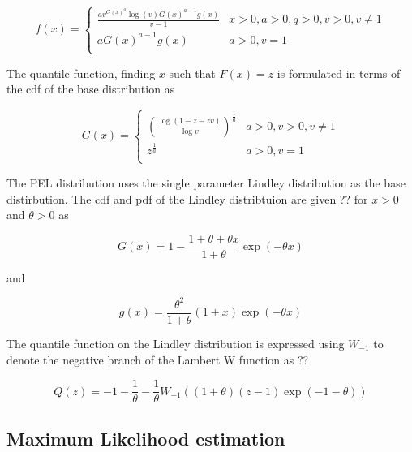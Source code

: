 \begin{equation}
  f\left(x\right) = \left\{
    \begin{array}{cl}
      \frac{ a v^{G\left(x\right)^{a}} \log\left(v\right) G\left(x\right)^{a-1}g\left(x\right)}{v-1} & x>0,a>0,q>0,v>0,v\neq1\\
      aG\left(x\right)^{a-1}g\left(x\right) & a>0,v=1\\
    \end{array}
    \right.
\end{equation}

The quantile function, finding $x$ such that $F\left(x\right) = z$ is formulated in terms of the cdf of the base distribution as

\begin{equation}
  G\left(x\right) = \left\{
    \begin{array}{cl}
      \left( \frac{ \log\left(1-z-zv\right) }{ \log v} \right)^{\frac{1}{a}} & a>0,v>0,v\neq1\\
      z^{\frac{1}{a}} & a>0,v=1\\
    \end{array}
    \right.
\end{equation}


The PEL distribution uses the single parameter Lindley distribution as the base distirbution. The cdf and pdf of the Lindley distribtuion are given ?? for $x>0$ and $\theta>0$ as

\begin{equation}
G\left(x\right) = 1 - \frac{1+\theta + \theta x}{1+\theta}\exp\left(-\theta x\right)
\end{equation}

and

\begin{equation}
g\left(x\right) = \frac{ \theta^2 }{1+\theta} \left(1+x\right)\exp\left(-\theta x\right)
\end{equation}

The quantile function on the Lindley distribution is expressed using $W_{-1}$ to denote the negative branch of the Lambert W function as ??

\begin{equation}
Q\left(z\right) = -1 - \frac{1}{\theta} - \frac{1}{\theta}W_{-1}\left( \left(1+\theta\right)\left(z-1\right)\exp\left(-1-\theta\right)\right)
\end{equation}


\subsection{Maximum Likelihood estimation}

